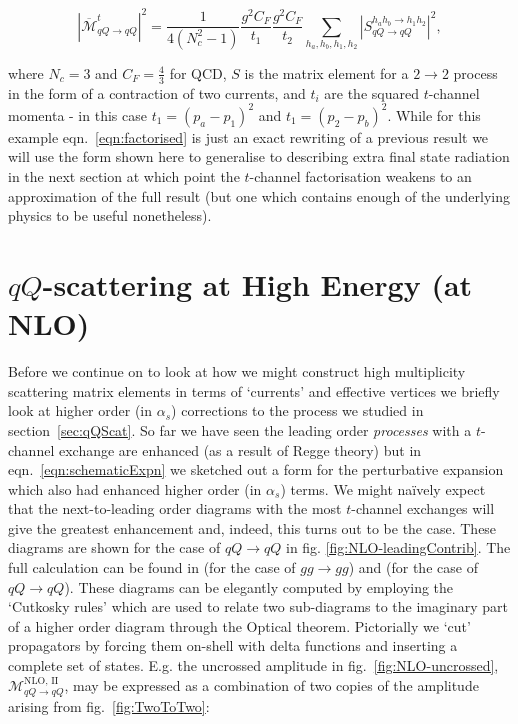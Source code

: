 		\begin{equation}
			|\overline{\mathcal{M}}^t_{qQ\rightarrow qQ}|^2 = \frac{1}{4(N_c^2-1)}
			\frac{g^2C_F}{t_1}\frac{g^2C_F}{t_2} \sum_{h_a, h_b, h_1, h_2}
			|S_{qQ\rightarrow qQ}^{h_ah_b\rightarrow h_1h_2}|^2,
			\label{eqn:factorised}
		\end{equation}

		where $N_c=3$ and $C_F=\frac{4}{3}$ for QCD, $S$ is the matrix element for a $2\rightarrow2$ process
		in the form of a contraction of two currents, and $t_i$ are the squared $t$-channel momenta - in this
		case $t_1=(p_a-p_1)^2$ and $t_1=(p_2-p_b)^2$.  While for this example eqn.~\eqref{eqn:factorised} is
		just an exact rewriting of a previous result we will use the form shown here to generalise to describing
		extra final state radiation in the next section at which point the $t$-channel factorisation weakens to
		an approximation of the full result (but one which contains enough of the underlying physics to be useful
		nonetheless).

	\section{$qQ$-scattering at High Energy (at NLO)}
		\label{sub:HE22_NLO}

		Before we continue on to look at how we might construct high multiplicity scattering matrix
		elements in terms of `currents' and effective vertices we briefly look at higher order (in
		$\alpha_s$) corrections to the process we studied in section~\ref{sec:qQScat}.
		So far we have seen the leading order \emph{processes} with a $t$-channel exchange are enhanced (as a result
		of Regge theory) but in
		eqn.~\eqref{eqn:schematicExpn} we sketched out a form for the perturbative expansion which also
		had enhanced higher order (in $\alpha_s$) terms.  We might na\"ively expect that the next-to-leading
		order diagrams with the most $t$-channel exchanges will give the greatest enhancement and, indeed,
		this turns out to be the case.  These diagrams are shown for the case of $qQ\rightarrow qQ$ in fig.
		\eqref{fig:NLO-leadingContrib}. The full calculation can be found in \cite{DelDuca:1995hf} (for
		the case of $gg\rightarrow gg$) and \cite{sabioThesis} (for the case of $qQ\rightarrow qQ$).  These
		diagrams can be elegantly computed by employing the `Cutkosky rules' which are used to relate two
		sub-diagrams to the imaginary part of a higher order diagram through the Optical theorem.  Pictorially
		we `cut' propagators by forcing them on-shell with delta functions and inserting a complete set of
		states.  E.g. the uncrossed amplitude in fig.~\eqref{fig:NLO-uncrossed},
		$\mathcal{M}_{qQ\rightarrow qQ}^{\text{NLO, II}}$, may be expressed as a combination of two copies
		of the amplitude arising from fig.~\eqref{fig:TwoToTwo}:

